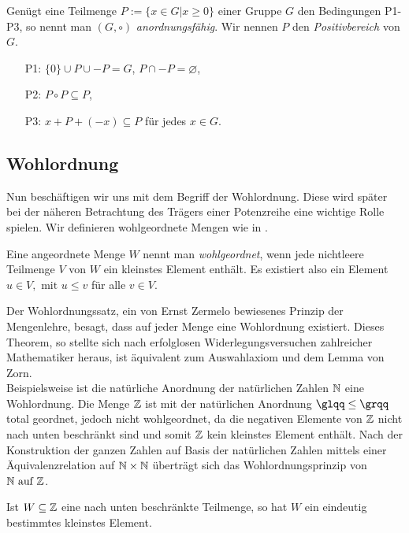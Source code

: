 %
\begin{bem}\label{afG} %
%
Genügt eine Teilmenge $P := \lbrace x \in G | x \geq 0\rbrace$ einer Gruppe $G$ den Bedingungen P1- P3, so nennt man $\left(G,\circ\right)$ \textit{anordnungsfähig}. Wir nennen $P$ den \textit{Positivbereich} von $G$.
%
\begin{enumerate}
\item[P1:] $\lbrace0\rbrace \cup P\cup -P = G$, $P \cap -P = \varnothing$,
\item[P2:] $P \circ P \subseteq P$,
\item[P3:] $x+P+(-x) \subseteq P$ für jedes $x \in G$.
\end{enumerate}

\end{bem}
%

\subsection{Wohlordnung}
Nun beschäftigen wir uns mit dem Begriff der Wohlordnung. Diese wird später bei der näheren Betrachtung des Trägers einer Potenzreihe eine wichtige Rolle spielen. Wir definieren wohlgeordnete Mengen wie in \cite[S. 16]{fuchs66}.
\begin{defn} \label{wohlgeordn} %
Eine angeordnete Menge $W$ nennt man \textit{wohlgeordnet}, wenn jede nichtleere Teilmenge $V$ von $W$ ein kleinstes Element enthält. Es existiert also ein Element $ u \in V, \text{ mit } u \le v $ für alle $ v \in V.$ 
\end{defn}
%
Der Wohlordnungssatz, ein von Ernst Zermelo bewiesenes Prinzip der Mengenlehre, besagt, dass auf jeder Menge eine Wohlordnung existiert. Dieses Theorem, so stellte sich nach erfolglosen Widerlegungsversuchen zahlreicher Mathematiker heraus, ist äquivalent zum Auswahlaxiom und dem Lemma von Zorn. \\
Beispielsweise ist die natürliche Anordnung der natürlichen Zahlen $\mathbb{N}$ eine Wohlordnung. Die Menge $\mathbb{Z}$ ist mit der natürlichen Anordnung $\glqq\leq\grqq$ total geordnet, jedoch nicht wohlgeordnet, da die negativen Elemente von $\mathbb{Z}$ nicht nach unten beschränkt sind und somit $\mathbb{Z}$ kein kleinstes Element enthält. Nach der Konstruktion der ganzen Zahlen auf Basis der natürlichen Zahlen mittels einer Äquivalenzrelation auf $\mathbb{N} \times \mathbb{N}$  überträgt sich das Wohlordnungsprinzip von $\mathbb{N} \text{ auf } \mathbb{Z}$.
\begin{bem} %
Ist $W \subseteq \mathbb{Z}$ eine nach unten beschränkte Teilmenge, so hat $W$ ein eindeutig bestimmtes kleinstes Element. 
\end{bem} 
